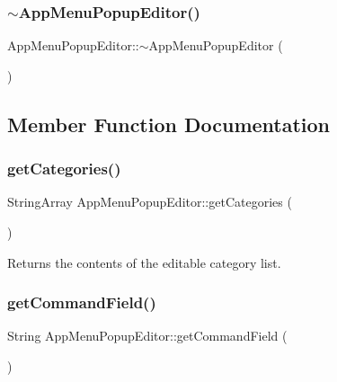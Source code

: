 \subsubsection{\texorpdfstring{$\sim$\+App\+Menu\+Popup\+Editor()}{~AppMenuPopupEditor()}}
{\footnotesize\ttfamily App\+Menu\+Popup\+Editor\+::$\sim$\+App\+Menu\+Popup\+Editor (\begin{DoxyParamCaption}{ }\end{DoxyParamCaption})\hspace{0.3cm}{\ttfamily [virtual]}}



\subsection{Member Function Documentation}
\mbox{\label{classAppMenuPopupEditor_a8874c19cbf5d9a0d8ac444fa5ba93787}} 
\subsubsection{\texorpdfstring{get\+Categories()}{getCategories()}}
{\footnotesize\ttfamily String\+Array App\+Menu\+Popup\+Editor\+::get\+Categories (\begin{DoxyParamCaption}{ }\end{DoxyParamCaption})}

\begin{DoxyReturn}{Returns}
the contents of the editable category list. 
\end{DoxyReturn}
\mbox{\label{classAppMenuPopupEditor_ad7c3a99952d32f0f7545bc642cb17565}} 
\subsubsection{\texorpdfstring{get\+Command\+Field()}{getCommandField()}}
{\footnotesize\ttfamily String App\+Menu\+Popup\+Editor\+::get\+Command\+Field (\begin{DoxyParamCaption}{ }\end{DoxyParamCaption})}

